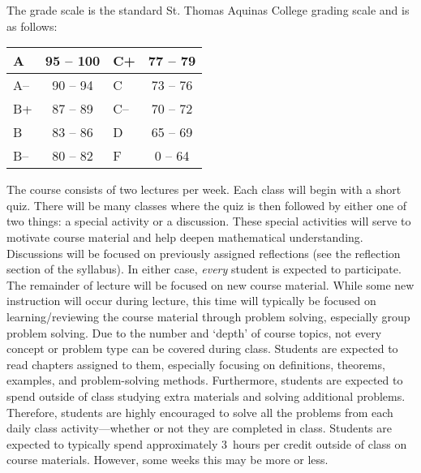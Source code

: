 \documentclass[11pt,letterpaper]{article}
\begin{document}
The grade scale is the standard St. Thomas Aquinas College grading scale and is as follows: \par
        \begin{table}[!ht]
        \centering
        \begin{tabular}{|l||c|l||c|} \hline
        A & 95 -- 100 & C+ & 77 -- 79 \\ \hline
        A-- & 90 -- 94 & C & 73 -- 76 \\ \hline
        B+ & 87 -- 89 & C-- & 70 -- 72 \\ \hline
        B & 83 -- 86 & D & 65 -- 69 \\ \hline
        B-- & 80 -- 82 & F & 0 -- 64 \\ \hline
        \end{tabular}
        \end{table}
\sectionbreak





\newpage





The course consists of two lectures per week. Each class will begin with a short quiz. There will be many classes where the quiz is then followed by either one of two things: a special activity or a discussion. These special activities will serve to motivate course material and help deepen mathematical understanding. Discussions will be focused on previously assigned reflections (see the reflection section of the syllabus). In either case, \textit{every} student is expected to participate. The remainder of lecture will be focused on new course material. While some new instruction will occur during lecture, this time will typically be focused on learning/reviewing the course material through problem solving, especially group problem solving. Due to the number and `depth' of course topics, not every concept or problem type can be covered during class. Students are expected to read chapters assigned to them, especially focusing on definitions, theorems, examples, and problem-solving methods. Furthermore, students are expected to spend outside of class studying extra materials and solving additional problems. Therefore, students are highly encouraged to solve all the problems from each daily class activity---whether or not they are completed in class. Students are expected to typically spend approximately 3~hours per credit outside of class on course materials. However, some weeks this may be more or less. 
\sectionbreak
\end{document}
